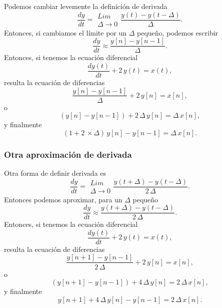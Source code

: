 Podemos cambiar levemente la definición de derivada
\begin{equation}
 \frac{dy}{dt} = \begin{array}{c}
                  Lim \\
                  \Delta \rightarrow 0
                 \end{array}
                 \frac{y(t) - y(t-\Delta)}{\Delta}.
\end{equation}
Entonces, si cambiamos el límite por un $\Delta$ pequeño, podemos escribir
\begin{equation}
 \frac{dy}{dt} \approx \frac{y[n] - y[n-1]}{\Delta}.
\end{equation}
Entonces, si tenemos la ecuación diferencial
\begin{equation}
 \frac{dy(t)}{dt} + 2 \, y(t) = x(t),
\end{equation}
resulta la ecuación de diferencias
\begin{equation}
 \frac{y[n] - y[n-1]}{\Delta} + 2 \, y[n] = x[n],
\end{equation}
o
\begin{equation}
(y[n] - y[n-1]) + 2 \,  \Delta \, y[n] = \Delta \, x[n],
\end{equation}
y finalmente
\begin{equation}
(1 + 2 \, \times \Delta) \, y[n] - y[n-1] = \Delta \, x[n].
\end{equation}

\subsubsection{Otra aproximación de derivada}
Otra forma de definir derivada es
\begin{equation}
 \frac{dy}{dt} = \begin{array}{c}
                  Lim \\
                  \Delta \rightarrow 0
                 \end{array}
                 \frac{y(t+\Delta) - y(t-\Delta)}{2 \, \Delta}.
\end{equation}
Entonces podemos aproximar, para un $\Delta$ pequeño
\begin{equation}
 \frac{dy}{dt} \approx
                 \frac{y(t+\Delta) - y(t-\Delta)}{2 \, \Delta}.
\end{equation}
Entonces, si tenemos la ecuación diferencial
\begin{equation}
 \frac{dy(t)}{dt} + 2 \, y(t) = x(t),
\end{equation}
resulta la ecuación de diferencias
\begin{equation}
 \frac{y[n+1] - y[n-1]}{2 \, \Delta} + 2 \, y[n] = x[n],
\end{equation}
o
\begin{equation}
(y[n+1] - y[n-1]) + 4 \, \Delta \, y[n] = 2 \, \Delta \, x[n],
\end{equation}
y finalmente
\begin{equation}
y[n+1] + 4 \, \Delta \, y[n] - y[n-1] = 2 \, \Delta \, x[n].
\end{equation}


